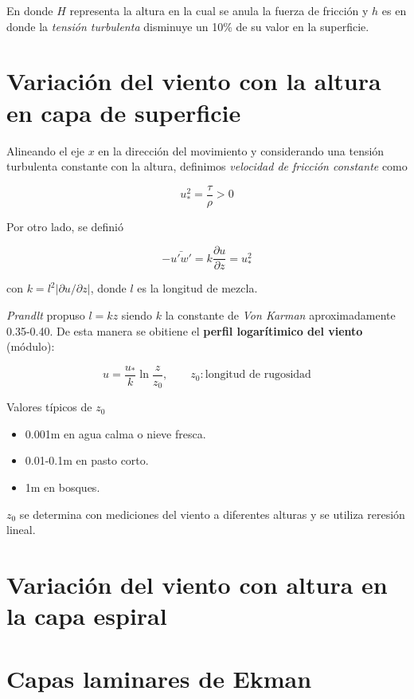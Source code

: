 \documentclass[openany,a4]{book}
\begin{document}
En donde $H$ representa la altura en la cual se anula la fuerza de
fricción y $h$ es en donde la \emph{tensión turbulenta} disminuye un
10\% de su valor en la superficie.

\section{Variación del viento con la altura en capa de superficie}
Alineando el eje $x$ en la dirección del movimiento y considerando una
tensión turbulenta constante con la altura, definimos \emph{velocidad
de fricción constante} como

\begin{equation}
    u_{*}^{2}=\frac{\tau}{\rho}>0
\end{equation}

\par Por otro lado, se definió

\begin{equation}
    -\bar{u'w'}=k \frac{\partial u}{\partial z}=u_{*}^{2}
\end{equation}

con $k=l^{2}\left|\partial u/\partial z\right|$, donde $l$ es la
longitud de mezcla.

\par \emph{Prandlt} propuso $l=kz$ siendo $k$ la constante de \emph{Von
Karman} aproximadamente 0.35-0.40. De esta manera se obitiene el
\textbf{perfil logarítimico del viento} (módulo):

\begin{equation}
    u=\frac{u_{*}}{k}\ln{\frac{z}{z_0}},\qquad z_0:\textrm{longitud de rugosidad}
\end{equation}

\par Valores típicos de $z_0$
\begin{itemize}
    \item 0.001m en agua calma o nieve fresca.
    \item 0.01-0.1m en pasto corto.
    \item 1m en bosques.
\end{itemize}
$z_0$ se determina con mediciones del viento a diferentes alturas y se
utiliza reresión lineal.

\section{Variación del viento con altura en la capa espiral}

\section{Capas laminares de Ekman}
\end{document}
